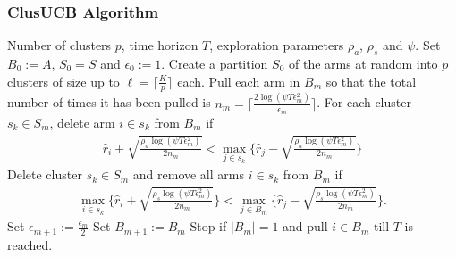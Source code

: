 \begin{frame}[allowframebreaks]
\frametitle{ClusUCB Algorithm}
\begin{algorithmic}[1]
 Number of clusters $p$, time horizon $T$, exploration parameters $\rho_a$, $\rho_s$ and $\psi$.
 Set $B_{0}:=A$, $S_0 = S$ and $\epsilon_{0}:=1$.
\State Create a partition $S_0$ of the arms at random into $p$ clusters of size up to $\ell=\bigg\lceil \frac{K}{p} \bigg\rceil$ each.
\State Pull each arm in $B_m$ so that the total number of times it has been pulled is $n_{m}=\bigg\lceil\frac{2\log{(\psi T\epsilon_{m}^{2})}}{\epsilon_{m}}\bigg\rceil$. 
\ArmElim
\State For each cluster $s_k \in S_{m}$, delete arm ${i}\in s_{k}$ from $B_{m}$ if
\begin{align*}
\hat{r}_{i} + \sqrt{\frac{\rho_{a}\log{(\psi T\epsilon_{m}^{2})}}{2 n_{m}}}  < \max_{{j}\in s_{k}}\bigg\lbrace\hat{r}_{j} -\sqrt{\frac{\rho_{a}\log{(\psi T\epsilon_{m}^{2})}}{2 n_{m}}} \bigg\rbrace
\end{align*}
\EndArmElim
\ClusElim
\State Delete cluster $s_{k}\in S_{m}$ and remove all arms $i\in s_{k}$ from $B_{m}$ if 
\begin{align*}
 \max_{{i}\in s_{k}}\bigg\lbrace\hat{r}_{i} + \sqrt{\frac{\rho_{s}\log{(\psi T\epsilon_{m}^{2})}}{2 n_{m}}}\bigg\rbrace 
 < \max_{{j}\in B_{m}} \bigg\lbrace\hat{r}_{j} - \sqrt{\frac{\rho_{s} \log{(\psi T\epsilon_{m}^{2})}}{2 n_{m}}}\bigg\rbrace.
\end{align*}
\EndClusElim
\State Set $\epsilon_{m+1}:=\frac{\epsilon_{m}}{2}$\vspace{0.5ex}
\State Set $B_{m+1}:=B_{m}$
\State Stop if $|B_{m}|=1$ and pull ${i}\in B_{m}$ till $T$ is reached.
\EndFor
\end{algorithmic}
\end{frame}

